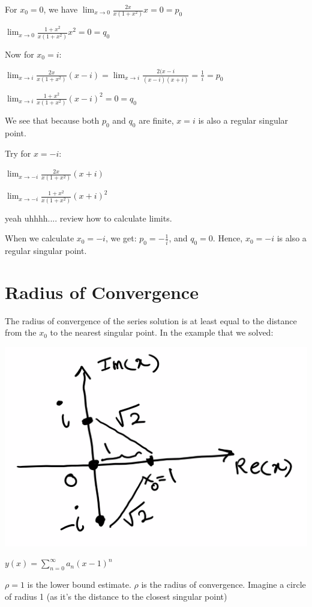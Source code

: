 \documentclass{article}
\begin{document}
For $x_0 = 0$, we have $\lim_{x \to 0} \frac{2x}{x(1+x^2)} x = 0 = p_0$

$\lim_{x \to 0} \frac{1+x^2}{x(1+x^2)} x^2 = 0 = q_0$

\hfill \break 

Now for $x_0 = i$:

$\lim_{x \to i} \frac{2x}{x (1+x^2)} (x - i) = \lim_{x \to i} \frac{2(x-i}{(x-i)(x+i)} = \frac{1}{i} = p_0$

$\lim_{x \to i} \frac{1+x^2}{x(1+x^2)} (x-i)^2 = 0 = q_0$

We see that because both $p_0$ and $q_0$ are finite, $x = i$ is also a regular singular point. 

Try for $x = -i$:

$\lim_{x \to -i} \frac{2x}{x (1+x^2)} (x+i)$

$\lim_{x \to -i} \frac{1+x^2}{x(1+x^2)} (x+i)^2$

yeah uhhhh.... review how to calculate limits. 

When we calculate $x_0 = -i$, we get: $p_0 = -\frac{1}{i}$, and $q_0 = 0$. Hence, $x_0 = -i$ is also a regular singular point. 

\section{Radius of Convergence}

The radius of convergence of the series solution is at least equal to the distance from the $x_0$ to the nearest singular point. In the example that we solved:

\includegraphics[width = 0.7 \textwidth]{image2.png}

$y(x) = \sum_{n = 0}^{\infty} a_n (x-1)^n$

$\rho = 1$ is the lower bound estimate. $\rho$ is the radius of convergence. Imagine a circle of radius 1 (as it's the distance to the closest singular point)
\end{document}
